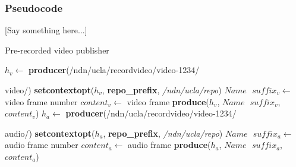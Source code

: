 \subsubsection{Pseudocode}

[Say something here...]

\begin{algorithm}[hbtp]
\caption{Pre-recorded video publisher}
\label{alg:recordproducer}
\begin{algorithmic}[3]
\State $h_v \leftarrow $ \textbf{producer}(/ndn/ucla/recordvideo/video-1234/

video/)
\State \textbf{setcontextopt}($h_v$, \textbf{repo\_prefix}, \textit{/ndn/ucla/repo})
\vspace{0.2cm}
	\State $Name \textbf{ } suffix_v \leftarrow $ video frame number
	\State $content_v \leftarrow $ video frame
	\State \textbf{produce}($h_v$, $Name\textbf{ }suffix_v$, $content_v$)
	\EndWhile
\vspace{0.2cm}
\vspace{0.2cm}
\State $h_a \leftarrow $ \textbf{producer}(/ndn/ucla/recordvideo/video-1234/

audio/)
\State \textbf{setcontextopt}($h_a$, \textbf{repo\_prefix}, \textit{/ndn/ucla/repo})
\vspace{0.2cm}
	\State $Name \textbf{ } suffix_a \leftarrow $ audio frame number
	\State $content_a \leftarrow $ audio frame
	\State \textbf{produce}($h_a$, $Name\textbf{ }suffix_a$, $content_a$)
	\EndWhile
\end{algorithmic}
\end{algorithm}

